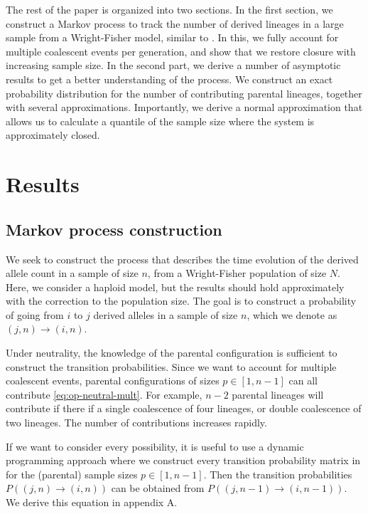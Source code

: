 \documentclass[review]{elsarticle}
\newcommand{\ra}{\rightarrow}
\begin{document}
The rest of the paper is organized into two sections. In the first section, we construct a Markov
process to track the number of derived lineages in a large sample from a Wright-Fisher model,
similar to \cite{JouganousEtAl2017,KammEtAl2017}. In this, we fully account for multiple coalescent
events per generation, and show that we restore closure with increasing sample size. In the second
part, we derive a number of asymptotic results to get a better understanding of the process. We
construct an exact probability distribution for the number of contributing parental lineages,
together with several approximations. Importantly, we derive a normal approximation that allows us
to calculate a quantile of the sample size where the system is approximately closed.

\section{Results}
\label{sec:results}

\subsection{Markov process construction}
\label{subsec:markov}

We seek to construct the process that describes the time evolution of the derived allele count in a
sample of size $n$, from a Wright-Fisher population of size $N$. Here, we consider a haploid model,
but the results should hold approximately with the correction to the population size. The goal is to
construct a probability of going from $i$ to $j$ derived alleles in a sample of size $n$, which we
denote as $(j,n)\ra(i,n)$.

Under neutrality, the knowledge of the parental configuration is sufficient to construct the
transition probabilities. Since we want to account for multiple coalescent events, parental
configurations of sizes $p \in [1, n-1]$ can all contribute \eqref{eq:op-neutral-mult}. For example,
$n-2$ parental lineages will contribute if there if a single coalescence of four lineages, or double
coalescence of two lineages. The number of contributions increases rapidly.

If we want to consider every possibility, it is useful to use a dynamic programming approach where
we construct every transition probability matrix in for the (parental) sample sizes $p \in [1,n-1]$.
Then the transition probabilities $P((j,n)\ra(i,n))$ can be obtained from $P((j,n-1)\ra(i,n-1))$.
We derive this equation in appendix A.
\end{document}
